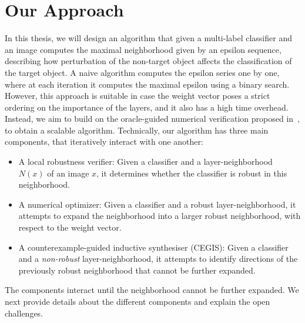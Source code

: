 
\section{Our Approach}

In this thesis, we will design an algorithm that given a multi-label classifier and an image computes the maximal neighborhood given by an epsilon sequence, describing how perturbation of the non-target object affects the classification of the target object.
A naive algorithm computes the epsilon series one by one, where at each iteration it computes the maximal epsilon using a binary search.
However, this approach is suitable in case the weight vector poses a strict ordering on the importance of the layers, and it also has a high time overhead.
Instead, we aim to build on the oracle-guided numerical verification proposed in~\cite{MARVEL}, to obtain a scalable algorithm.
Technically, our algorithm has three main components, that iteratively interact with one another:
\begin{itemize}
    \item A local robustness verifier: Given a classifier and a layer-neighborhood $N(x)$ of an image $x$, it determines whether the classifier is robust in this neighborhood. 
        \item A numerical optimizer: Given a classifier and a robust layer-neighborhood, it attempts to expand the neighborhood into a larger robust neighborhood, with respect to the weight vector. %
    \item A counterexample-guided inductive synthesiser (CEGIS): Given a classifier and a \emph{non-robust} layer-neighborhood, it attempts to identify directions of the previously robust neighborhood that cannot be further expanded. 
    \end{itemize}
The components interact until the neighborhood cannot be further expanded.
We next provide details about the different components and explain the open challenges.
